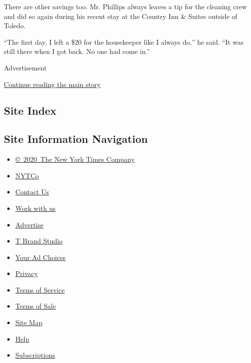 There are other savings too. Mr. Phillips always leaves a tip for the
cleaning crew and did so again during his recent stay at the Country Inn
\& Suites outside of Toledo.

``The first day, I left a \$20 for the housekeeper like I always do,''
he said. ``It was still there when I got back. No one had come in.''

Advertisement

\protect\hyperlink{after-bottom}{Continue reading the main story}

\hypertarget{site-index}{%
\subsection{Site Index}\label{site-index}}

\hypertarget{site-information-navigation}{%
\subsection{Site Information
Navigation}\label{site-information-navigation}}

\begin{itemize}
\tightlist
\item
  \href{https://help.nytimes3xbfgragh.onion/hc/en-us/articles/115014792127-Copyright-notice}{©~2020~The
  New York Times Company}
\end{itemize}

\begin{itemize}
\tightlist
\item
  \href{https://www.nytco.com/}{NYTCo}
\item
  \href{https://help.nytimes3xbfgragh.onion/hc/en-us/articles/115015385887-Contact-Us}{Contact
  Us}
\item
  \href{https://www.nytco.com/careers/}{Work with us}
\item
  \href{https://nytmediakit.com/}{Advertise}
\item
  \href{http://www.tbrandstudio.com/}{T Brand Studio}
\item
  \href{https://www.nytimes3xbfgragh.onion/privacy/cookie-policy\#how-do-i-manage-trackers}{Your
  Ad Choices}
\item
  \href{https://www.nytimes3xbfgragh.onion/privacy}{Privacy}
\item
  \href{https://help.nytimes3xbfgragh.onion/hc/en-us/articles/115014893428-Terms-of-service}{Terms
  of Service}
\item
  \href{https://help.nytimes3xbfgragh.onion/hc/en-us/articles/115014893968-Terms-of-sale}{Terms
  of Sale}
\item
  \href{https://spiderbites.nytimes3xbfgragh.onion}{Site Map}
\item
  \href{https://help.nytimes3xbfgragh.onion/hc/en-us}{Help}
\item
  \href{https://www.nytimes3xbfgragh.onion/subscription?campaignId=37WXW}{Subscriptions}
\end{itemize}
